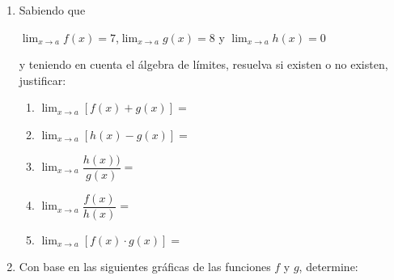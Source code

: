 \documentclass[letterpaper,twoside]{article}
\let\ds\displaystyle
\begin{document}
\begin{enumerate}
 \item Sabiendo que
 \newpage
\begin{center}
$\ds{\lim_{x\rightarrow a}f(x)=7}$,\quad  $\ds{\lim_{x\rightarrow a}g(x)=8}$ \quad y \quad $\ds{\lim_{x\rightarrow a}h(x)=0}$ 
\end{center}
y teniendo en cuenta el álgebra de límites, resuelva si existen o no existen, justificar:
      \begin{enumerate}
	 \item $\ds{\lim_{x\rightarrow a}[f(x)+g(x)]}=$
	 \item $\ds{\lim_{x\rightarrow a}[h(x)-g(x)]}=$
	 \item $\ds{\lim_{x\rightarrow a}\dfrac{h(x))}{g(x)}}=$
	 \item $\ds{\lim_{x\rightarrow a}\dfrac{f(x)}{h(x)}}=$
	 \item $\ds{\lim_{x\rightarrow a}[f(x)\cdot g(x)]}=$
      \end{enumerate}
   \item Con base en las siguientes gráficas de las funciones $f$ y $g$, determine:


\end{enumerate}
\end{document}
